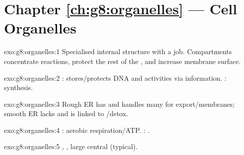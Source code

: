 \section*{Chapter \ref{ch:g8:organelles} --- Cell Organelles}

\begin{solution}{exo:g8:organelles:1}
Specialised internal structure with a job. Compartments concentrate
reactions, protect the rest of the , and increase membrane surface.
\end{solution}

\begin{solution}{exo:g8:organelles:2}
: stores/protects DNA and   activities via 
information. :  synthesis.
\end{solution}

\begin{solution}{exo:g8:organelles:3}
Rough ER has  and handles many  for export/membranes;
smooth ER lacks  and is linked to /detox.
\end{solution}

\begin{solution}{exo:g8:organelles:4}
: aerobic respiration/ATP. : .
\end{solution}

\begin{solution}{exo:g8:organelles:5}
, , large central  (typical).
\end{solution}

